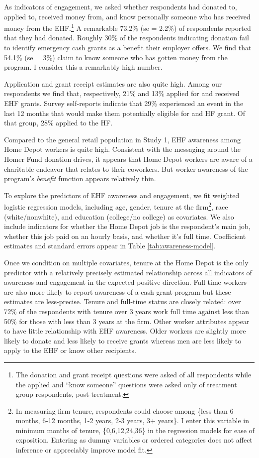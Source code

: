 \documentclass[
  11pt,
  oneside]{article}
\begin{document}
As indicators of engagement, we asked whether respondents had donated to, applied to, received money from, and know personally someone who has received money from the EHF.\footnote{The donation and grant receipt questions were asked of all respondents while the applied and ``know someone'' questions were asked only of treatment group respondents, post-treatment.} A remarkable 73.2\% (se = 2.2\%) of respondents reported that they had donated. Roughly 30\% of the respondents indicating donation fail to identify emergency cash grants as a benefit their employer offers. We find that 54.1\% (se = 3\%) claim to know someone who has gotten money from the program. I consider this a remarkably high number.

Application and grant receipt estimates are also quite high. Among our respondents we find that, respectively, 21\% and 13\% applied for and received EHF grants. Survey self-reports indicate that 29\% experienced an event in the last 12 months that would make them potentially eligible for and HF grant. Of that group, 28\% applied to the HF.

Compared to the general retail population in Study 1, EHF awareness among Home Depot workers is quite high. Consistent with the messaging around the Homer Fund donation drives, it appears that Home Depot workers are aware of a charitable endeavor that relates to their coworkers. But worker awareness of the program's \emph{benefit} function appears relatively thin.

To explore the predictors of EHF awareness and engagement, we fit weighted logistic regression models, including age, gender, tenure at the firm\footnote{In measuring firm tenure, respondents could choose among \{less than 6 months, 6-12 months, 1-2 years, 2-3 years, 3+ years\}. I enter this variable in minimum months of tenure, \{0,6,12,24,36\} in the regression models for ease of exposition. Entering as dummy variables or ordered categories does not affect inference or appreciably improve model fit.}, race (white/nonwhite), and education (college/no college) as covariates. We also include indicators for whether the Home Depot job is the respondent's main job, whether this job paid on an hourly basis, and whether it's full time. Coefficient estimates and standard errors appear in Table \ref{tab:awareness-model}.

Once we condition on multiple covariates, tenure at the Home Depot is the only predictor with a relatively precisely estimated relationship across all indicators of awareness and engagement in the expected positive direction. Full-time workers are also more likely to report awareness of a cash grant program but these estimates are less-precise. Tenure and full-time status are closely related: over 72\% of the respondents with tenure over 3 years work full time against less than 50\% for those with less than 3 years at the firm. Other worker attributes appear to have little relationship with EHF awareness. Older workers are slightly more likely to donate and less likely to receive grants whereas men are less likely to apply to the EHF or know other recipients.
\end{document}
